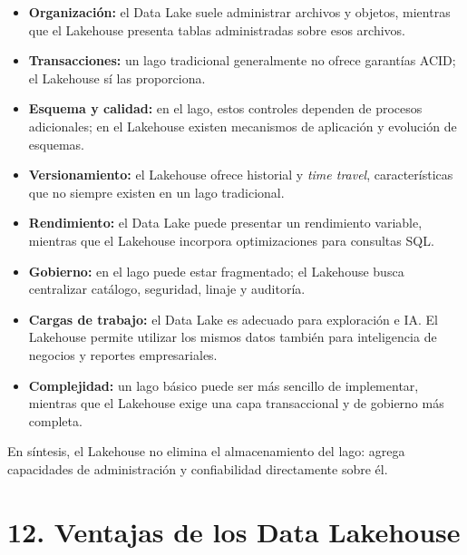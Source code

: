 \begin{itemize}
    \item \textbf{Organización:} el Data Lake suele administrar archivos y
    objetos, mientras que el Lakehouse presenta tablas administradas sobre esos
    archivos.

    \item \textbf{Transacciones:} un lago tradicional generalmente no ofrece
    garantías ACID; el Lakehouse sí las proporciona.

    \item \textbf{Esquema y calidad:} en el lago, estos controles dependen de
    procesos adicionales; en el Lakehouse existen mecanismos de aplicación y
    evolución de esquemas.

    \item \textbf{Versionamiento:} el Lakehouse ofrece historial y
    \textit{time travel}, características que no siempre existen en un lago
    tradicional.

    \item \textbf{Rendimiento:} el Data Lake puede presentar un rendimiento
    variable, mientras que el Lakehouse incorpora optimizaciones para consultas
    SQL.

    \item \textbf{Gobierno:} en el lago puede estar fragmentado; el Lakehouse
    busca centralizar catálogo, seguridad, linaje y auditoría.

    \item \textbf{Cargas de trabajo:} el Data Lake es adecuado para
    exploración e IA. El Lakehouse permite utilizar los mismos datos también
    para inteligencia de negocios y reportes empresariales.

    \item \textbf{Complejidad:} un lago básico puede ser más sencillo de
    implementar, mientras que el Lakehouse exige una capa transaccional y de
    gobierno más completa.
\end{itemize}

En síntesis, el Lakehouse no elimina el almacenamiento del lago: agrega
capacidades de administración y confiabilidad directamente sobre él.

\section*{12. Ventajas de los Data Lakehouse}

